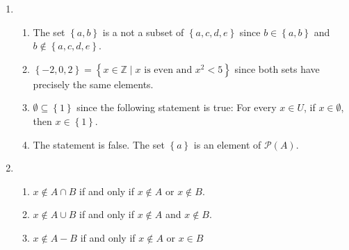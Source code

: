 \begin{enumerate}
\item \begin{enumerate}
\item The set $\left\{ {a, b} \right\}$ is a not a subset of  $\left\{ {a, c, d, e} \right\}$
 since  $b \in \left\{ {a, b} \right\}$ and  $b \notin \left\{ {a, c, d, e} \right\}$.

\item $\left\{ { - 2,0,2} \right\} = \left\{ {x \in \mathbb{Z} \mid  
x\text{ is even  and  }x^2  < 5} \right\}$ since both sets have precisely the same elements.

\item $\emptyset \subseteq \left\{ 1 \right\}$ since the following statement is true:
For every $x \in U$, if $x \in \emptyset$, then $x \in \left\{ 1 \right\}$.

\item The statement is false.  The set $\left\{ a \right\}$ is an element of 
$\mathcal{P} \left( A \right)$.
\end{enumerate}


\item \begin{enumerate}
\item $x \notin A \cap B$ if and only if $x \notin A$ or $x \notin B$.

\item $x \notin A \cup B$ if and only if $x \notin A$ and $x \notin B$.

\item $x \notin A - B$ if and only if $x \notin A$ or $x \in B$
\end{enumerate}




\end{enumerate}
